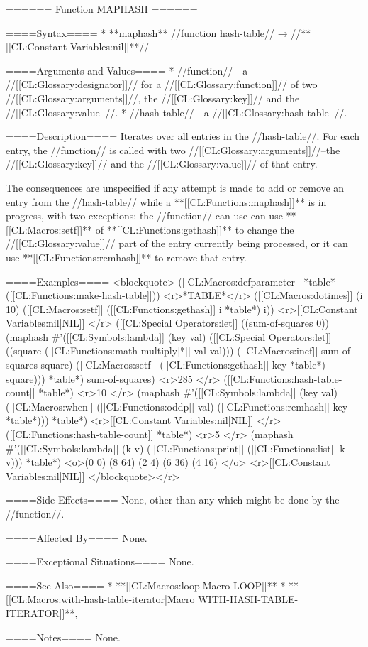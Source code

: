 ====== Function MAPHASH ======

====Syntax====
  * **maphash** //function hash-table// → //**[[CL:Constant Variables:nil]]**//

====Arguments and Values====
  * //function// - a //[[CL:Glossary:designator]]// for a //[[CL:Glossary:function]]// of two //[[CL:Glossary:arguments]]//, the //[[CL:Glossary:key]]// and the //[[CL:Glossary:value]]//.
  * //hash-table// - a //[[CL:Glossary:hash table]]//.

====Description====
Iterates over all entries in the //hash-table//. For each entry, the //function// is called with two //[[CL:Glossary:arguments]]//--the //[[CL:Glossary:key]]// and the //[[CL:Glossary:value]]// of that entry.

The consequences are unspecified if any attempt is made to add or remove an entry from the //hash-table// while a **[[CL:Functions:maphash]]** is in progress, with two exceptions: the //function// can use can use **[[CL:Macros:setf]]** of **[[CL:Functions:gethash]]** to change the //[[CL:Glossary:value]]// part of the entry currently being processed, or it can use **[[CL:Functions:remhash]]** to remove that entry.

====Examples====
<blockquote>
([[CL:Macros:defparameter]] *table* ([[CL:Functions:make-hash-table]])) <r>*TABLE*</r>
([[CL:Macros:dotimes]] (i 10) ([[CL:Macros:setf]] ([[CL:Functions:gethash]] i *table*) i)) <r>[[CL:Constant Variables:nil|NIL]] </r>
([[CL:Special Operators:let]] ((sum-of-squares 0)) 
  (maphash #'([[CL:Symbols:lambda]] (key val) 
               ([[CL:Special Operators:let]] ((square ([[CL:Functions:math-multiply|*]] val val))) 
                 ([[CL:Macros:incf]] sum-of-squares square) 
                 ([[CL:Macros:setf]] ([[CL:Functions:gethash]] key *table*) square)))
           *table*) 
  sum-of-squares) <r>285 </r>
([[CL:Functions:hash-table-count]] *table*) <r>10 </r>
(maphash #'([[CL:Symbols:lambda]] (key val) 
             ([[CL:Macros:when]] ([[CL:Functions:oddp]] val) ([[CL:Functions:remhash]] key *table*)))
         *table*) <r>[[CL:Constant Variables:nil|NIL]] </r>
([[CL:Functions:hash-table-count]] *table*) <r>5 </r>
(maphash #'([[CL:Symbols:lambda]] (k v) ([[CL:Functions:print]] ([[CL:Functions:list]] k v))) *table*)
<o>(0 0)
(8 64) 
(2 4) 
(6 36) 
(4 16) </o>
<r>[[CL:Constant Variables:nil|NIL]] </blockquote></r>

====Side Effects====
None, other than any which might be done by the //function//.

====Affected By====
None.

====Exceptional Situations====
None.

====See Also====
  * **[[CL:Macros:loop|Macro LOOP]]**
  * **[[CL:Macros:with-hash-table-iterator|Macro WITH-HASH-TABLE-ITERATOR]]**,

{\secref\TraversalRules}

====Notes====
None.

